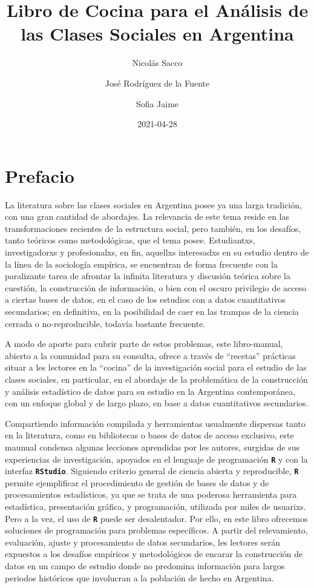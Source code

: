 \documentclass[
]{book}
\title{Libro de Cocina para el Análisis de las Clases Sociales en Argentina}
\author{Nicolás Sacco \and José Rodríguez de la Fuente \and Sofia Jaime}
\date{2021-04-28}
\begin{document}
\maketitle

{
\setcounter{tocdepth}{1}
\tableofcontents
}
\hypertarget{prefacio}{%
\chapter*{Prefacio}\label{prefacio}}

La literatura sobre las clases sociales en Argentina posee ya una larga tradición, con una gran cantidad de abordajes. La relevancia de este tema reside en las transformaciones recientes de la estructura social, pero también, en los desafíos, tanto teóricos como metodológicas, que el tema posee. Estudiantxs, investigadorxs y profesionalxs, en fin, aquellxs interesadxs en su estudio dentro de la línea de la sociología empírica, se encuentran de forma frecuente con la paralizante tarea de afrontar la infinita literatura y discusión teórica sobre la cuestión, la construcción de información, o bien con el oscuro privilegio de acceso a ciertas bases de datos, en el caso de los estudios con a datos cuantitativos secundarios; en definitiva, en la posibilidad de caer en las trampas de la ciencia cerrada o no-reproducible, todavía bastante frecuente.

A modo de aporte para cubrir parte de estos problemas, este libro-manual, abierto a la comunidad para su consulta, ofrece a través de ``recetas'' prácticas situar a les lectores en la ``cocina'' de la investigación social para el estudio de las clases sociales, en particular, en el abordaje de la problemática de la construcción y análisis estadístico de datos para su estudio en la Argentina contemporánea, con un enfoque global y de largo plazo, en base a datos cuantitativos secundarios.

Compartiendo información compilada y herramientas usualmente dispersas tanto en la literatura, como en bibliotecas o bases de datos de acceso exclusivo, este maunual condensa algunas lecciones aprendidas por les autores, surgidas de sus experiencias de investigación, apoyados en el lenguaje de programación \textbf{\texttt{R}} y con la interfaz \textbf{\texttt{RStudio}}. Siguiendo criterio general de ciencia abierta y reproducible, \textbf{\texttt{R}} permite ejemplificar el procedimiento de gestión de bases de datos y de procesamientos estadísticos, ya que se trata de una poderosa herramienta para estadística, presentación gráfica, y programación, utilizada por miles de usuarixs. Pero a la vez, el uso de \textbf{\texttt{R}} puede ser desalentador. Por ello, en este libro ofrecemos soluciones de programación para problemas específicos. A partir del relevamiento, evaluación, ajuste y procesamiento de datos secundarios, les lectores serán expuestos a los desafíos empíricos y metodológicos de encarar la construcción de datos en un campo de estudio donde no predomina información para largos periodos históricos que involucran a la población de hecho en Argentina.
\end{document}
